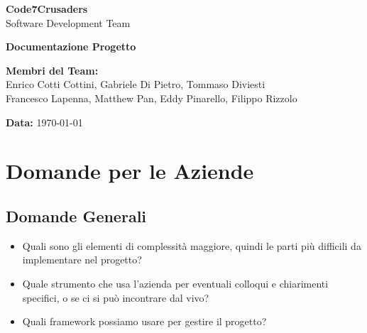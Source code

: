 \documentclass{article}
\begin{document}
\begin{titlepage}
    {\Huge \textbf{Code7Crusaders}}\\
    \vspace{0.5cm}
    {\Large Software Development Team}\\
    \vspace{2cm}
    
    {\large \textbf{Documentazione Progetto}}\\
    \vspace{5cm}

    \textbf{Membri del Team:}\\
    Enrico Cotti Cottini, Gabriele Di Pietro, Tommaso Diviesti \\
    Francesco Lapenna, Matthew Pan, Eddy Pinarello, Filippo Rizzolo \\
    \vspace{0.5cm}
    
    {\large \textbf{Data:}} \today\\
    
    \vspace{1cm}
\end{titlepage}

\newpage
\tableofcontents
\newpage

\section{Domande per le Aziende}\label{sec:domande-aziende}
\subsection{Domande Generali}\label{subsec:domande-generali}
\begin{itemize}
    \item Quali sono gli elementi di complessità maggiore, quindi le parti più difficili da implementare nel progetto?
    \item Quale strumento che usa l’azienda per eventuali colloqui e chiarimenti specifici, o se ci si può incontrare dal vivo?
    \item Quali framework possiamo usare per gestire il progetto? 
\end{itemize}
\end{document}

